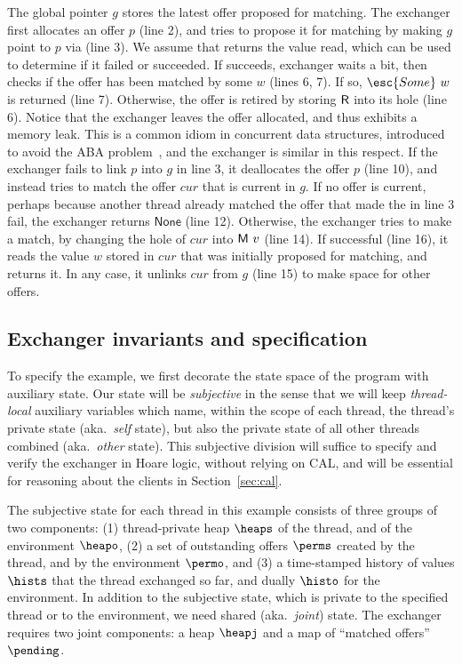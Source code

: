 The global pointer $g$ stores the latest offer proposed for
matching. The exchanger first allocates an offer $p$ (line 2), and
tries to propose it for matching by making $g$ point to $p$ via 
(line 3). We assume that  returns the value read, which can be used
to determine if it failed or succeeded. If  succeeds, exchanger
waits a bit, then checks if the offer has been matched by some $w$
(lines 6, 7). If so, $\esc{Some}\ w$ is returned (line 7). Otherwise,
the offer is retired by storing ${\mathsf{R}}$ into its hole (line
6). Notice that the exchanger leaves the offer allocated, and thus
exhibits a memory leak. This is a common idiom in concurrent data
structures, introduced to avoid the ABA
problem~\cite{Herlihy-Shavit:08,Treiber:TR}, and the exchanger is
similar in this respect.
%
If the exchanger fails to link $p$ into $g$ in line 3, it deallocates
the offer $p$ (line 10), and instead tries to match the offer $cur$
that is current in $g$. If no offer is current, perhaps because
another thread already matched the offer that made the  in line 3
fail, the exchanger returns $\mathsf{None}$ (line 12). Otherwise, the
exchanger tries to make a match, by changing the hole of $cur$ into
${\mathsf{M}\ v}$ (line 14). If successful (line 16), it reads the value $w$
stored in $cur$ that was initially proposed for matching, and returns
it. In any case, it unlinks $cur$ from $g$ (line 15) to make space for
other offers.
%

\subsection{Exchanger invariants and specification}

To specify the example, we first decorate the state space of the
program with auxiliary state. Our state will be \emph{subjective} in
the sense that we will keep \emph{thread-local} auxiliary variables
which name, within the scope of each thread, the thread's private
state (aka.~\emph{self} state), but also the private state of all
other threads combined (aka.~\emph{other} state). This subjective
division will suffice to specify and verify the exchanger in Hoare
logic, without relying on CAL, and will be essential for reasoning
about the clients in Section~\ref{sec:cal}.
%

The subjective state for each thread in this example consists of three
groups of two components: (1) thread-private heap $\heaps$ of the
thread, and of the environment $\heapo$, (2) a set of outstanding
offers $\perms$ created by the thread, and by the environment
$\permo$, and (3) a time-stamped history of values $\hists$ that the
thread exchanged so far, and dually $\histo$ for the environment.  In
addition to the subjective state, which is private to the specified
thread or to the environment, we need shared (aka.~\emph{joint})
state. The exchanger requires two joint components: a heap $\heapj$
and a map of ``matched offers'' $\pending$.

